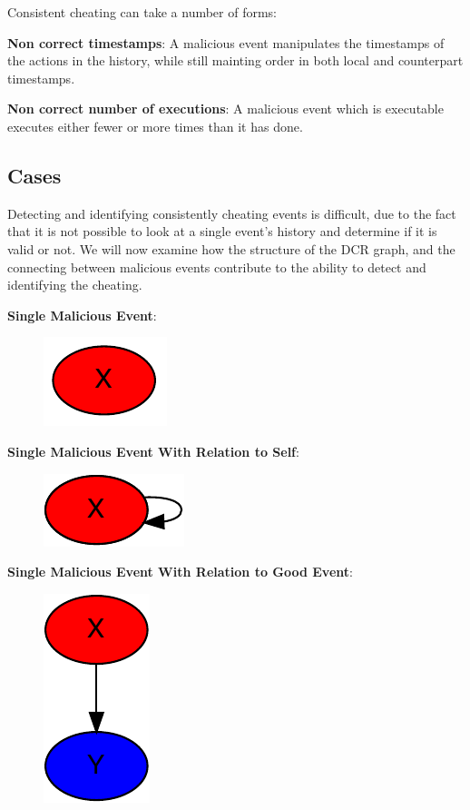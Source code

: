 	\newpar Consistent cheating can take a number of forms:
	

	\newpar \textbf{Non correct timestamps}: A malicious event manipulates the timestamps of the actions in the history, while still mainting order in both local and counterpart timestamps.
	
	\newpar \textbf{Non correct number of executions}: A malicious event which is executable executes either fewer or more times than it has done.
	
	\subsection{Cases}
	Detecting and identifying consistently cheating events is difficult, due to the fact that it is not possible to look at a single event's history and determine if it is valid or not. We will now examine how the structure of the DCR graph, and the connecting between malicious events contribute to the ability to detect and identifying the cheating.
	
	\newpar \textbf{Single Malicious Event}: 
	
	\begin{figure}[H]
		\centering
		\includegraphics[]{6consensus/images/1.pdf}
		\caption{}
		\label{fig:consensus:single}
	\end{figure}
	
	\newpar \textbf{Single Malicious Event With Relation to Self}:
	
	\begin{figure}[H]
		\centering
		\includegraphics[]{6consensus/images/5.pdf}
		\caption{}
		\label{fig:consensus:single}
	\end{figure}
	
	\newpar \textbf{Single Malicious Event With Relation to Good Event}:
	 
	\begin{figure}[H]
		\centering
		\includegraphics[]{6consensus/images/3.pdf}
		\caption{}
		\label{fig:consensus:single}
	\end{figure}
	

